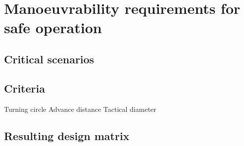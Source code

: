 \chapter{Manoeuvrability requirements for safe operation}

\section{Critical scenarios}

\section{Criteria}
Turning circle
Advance distance
Tactical diameter

\section{Resulting design matrix}
